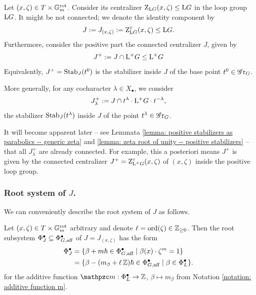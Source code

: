 Let $(x, \zeta) \in T \times \mathbb{G}_m^{\mathrm{rot}}$. Consider its centralizer $\operatorname{Z}_{\mathrm{L} G}(x, \zeta) \leq \mathrm{L} G$ in the loop group $\mathrm{L} G$. It might be not connected; we denote the identity component by
\begin{equation}
J := J_{(x, \zeta)} := \operatorname{Z}^{\circ}_{\mathrm{L} G}(x, \zeta) \leq \mathrm{L} G.
\end{equation}
%
Furthermore, consider the positive part the connected centralizer $J$, given by
\begin{equation}
J^+ 
:= J \cap \mathrm{L^+} G \leq \mathrm{L^+} G   
\end{equation}
Equivalently, $J^+ = \operatorname{Stab}_{J}(t^{0})$ is the stabilizer inside $J$ of the base point $t^{0} \in \operatorname{\mathscr{G}r}_G$. 

%
More generally, for any cocharacter $\lambda \in X_{\bullet}$, we consider
\begin{equation}\label{equation: positive stabilizer}
    J^{+}_{\lambda} := J \cap t^{\lambda} \cdot \mathrm{L^+} G \cdot t^{-\lambda},
\end{equation}
the stabilizer $\operatorname{Stab}_{J}(t^{\lambda})$ inside $J$ of the point $t^{\lambda} \in \operatorname{\mathscr{G}r}_G$.

\begin{remark}
It will become apparent later -- see Lemmata \ref{lemma: positive stabilizers as parabolics -- generic zeta} and \ref{lemma: zeta root of unity -- positive stabilizers} -- that all $J^{+}_{\lambda}$ are already connected. For example, this a posteriori means $J^{+}$ is given by the connected centralizer $J^+ = \operatorname{Z}^{\circ}_{\mathrm{L^+} G}(x, \zeta)$ of $(x, \zeta)$ inside the positive loop group.   
\end{remark}


\subsubsection{Root system of $J$.}
We can conveniently describe the root system of $J$ as follows.
\begin{lemma}\label{lemma: root spaces of J}
Let $(x, \zeta) \in T \times \mathbb{G}_m^{\mathrm{rot}}$ arbitrary and denote $\ell= \mathrm{ord}(\zeta) \in \operatorname{\mathbb{Z}}_{\geq 0}$. Then the root subsystem $\Phi^{\bullet}_J \subseteq \Phi^{\bullet}_{G, \mathrm{aff}}$ of $J = J_{(x, \zeta)}$ has the form    
\begin{align*}
\Phi^{\bullet}_J 
&= \{ \beta + m\hbar \in \Phi^{\bullet}_{G, \mathrm{aff}} \mid \beta(x) \cdot \zeta^{m} = 1 \} \\
&= \{\beta - (m_{\beta} + \ell \operatorname{\mathbb{Z}})\hbar \in \Phi^{\bullet}_{G, \mathrm{aff}} \mid \beta \in \Phi^{\bullet}_{L}\}.
\end{align*}
for the additive function $\mm: \Phi^{\bullet}_L \to \Z$, $\beta \mapsto m_{\beta}$ from Notation \ref{notation: additive function m}.
\end{lemma}

